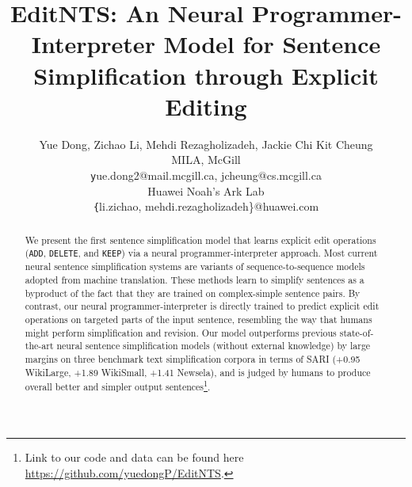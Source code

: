 \documentclass[11pt,a4paper]{article}
\title{EditNTS: An Neural Programmer-Interpreter Model for Sentence Simplification through Explicit Editing}
\author{Yue Dong, Zichao Li, Mehdi Rezagholizadeh, Jackie Chi Kit Cheung\\
MILA, McGill\\
{\texttt yue.dong2@mail.mcgill.ca, jcheung@cs.mcgill.ca}\\
Huawei Noah's Ark Lab\\
{\texttt \{li.zichao, mehdi.rezagholizadeh\}@huawei.com}}
\date{}
\def\add{{\texttt{ADD}}}
\def\delete{{\texttt{DELETE}}}
\def\keep{{\texttt{KEEP}}}
\def\wikilarge{WikiLarge}
\def\wikismall{WikiSmall}
\def\newsela{Newsela}
\begin{document}
\maketitle
\begin{abstract}
We present the first sentence simplification model that learns explicit edit operations (\add, \delete, and \keep) via a neural programmer-interpreter approach. Most current neural sentence simplification systems are variants of sequence-to-sequence models adopted from machine translation. These methods learn to simplify sentences as a byproduct of the fact that they are trained on complex-simple sentence pairs. By contrast, our neural programmer-interpreter is directly trained to predict explicit edit operations on targeted parts of the input sentence, resembling the way that humans might perform simplification and revision. Our model outperforms previous state-of-the-art neural sentence simplification models (without external knowledge) by large margins on three benchmark text simplification corpora in terms of SARI (+0.95 \wikilarge, +1.89 \wikismall, +1.41 \newsela), and is judged by humans to produce overall better and simpler output sentences\footnote{Link to our code and data can be found here \url{https://github.com/yuedongP/EditNTS}.}. 
\end{abstract}
\end{document}

